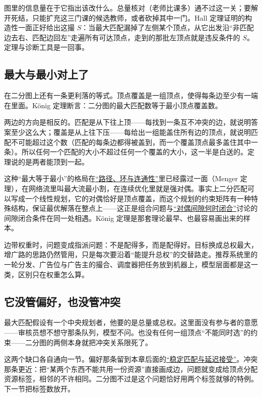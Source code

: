 图里的信息量在于它指出该改什么。总量核对（老师比课多）通不过这一关；要解开死结，只能扩充这三门课的候选教师，或者砍掉其中一门。Hall 定理证明的构造性一面正好给出这撮 \(S\)：当最大匹配漏掉了左侧某个顶点，从它出发沿``非匹配边去右、匹配边回左''走遍所有可达顶点，走到的那批左顶点就是违反条件的 \(S\)。定理与诊断工具是一回事。

\subsection{最大与最小对上了}

在二分图上还有一条更利落的等式。顶点覆盖是一组顶点，使得每条边至少有一端在里面。König 定理断言：二分图的最大匹配数等于最小顶点覆盖数。

两边的方向是相反的。匹配是从下往上顶——每找到一条互不冲突的边，就说明答案至少这么大；覆盖是从上往下压——每给出一组能盖住所有边的顶点，就说明匹配不可能超过这个数（匹配的每条边都得被盖到，而一个覆盖顶点最多盖住其中一条）。所以任何一个匹配的大小不超过任何一个覆盖的大小，这一半是白送的。定理说的是两者能顶到一起。

这种``最大等于最小''的格局在\hyperref[sec:04-Discrete-Mathematics/03-Graph-Theory/02]{``路径、环与连通性''}里已经露过一面（Menger 定理），在网络流里叫最大流最小割，在连续优化里就是强对偶。事实上二分匹配可以写成一个线性规划，它的对偶恰好是顶点覆盖，而这个规划的约束矩阵有一种特殊结构，保证最优解落在整点上——这正是组合问题与\hyperref[sec:09-Convex-Optimization/05-Duality/02]{``对偶间隙何时闭合''}讨论的间隙闭合条件在同一处相遇。König 定理是那套理论最早、也最容易画出来的样本。

边带权重时，问题变成指派问题：不是配得多，而是配得好。目标换成总权最大，增广路的思路仍然管用，只是每次要沿着``能提升总权''的交替路走。推荐系统里的一轮分发、广告位与广告主的撮合、调度器把任务放到机器上，模型层面都是这一类，区别只在权重怎么算。

\subsection{它没管偏好，也没管冲突}

最大匹配假设有一个中央规划者，他要的是总量或总权。这里面没有参与者的意愿——审核员想不想守那条队列，模型不问。也没有任何一组顶点``不能同时选''的约束——二分图的两侧本身就把冲突关系限死了。

这两个缺口各自通向一节。偏好那条留到本章后面的\hyperref[sec:04-Discrete-Mathematics/03-Graph-Theory/06]{``稳定匹配与延迟接受''}。冲突那条更近：把``某两个东西不能共用一份资源''直接画成边，问题就变成给顶点分配资源标签，相邻的不许相同。二分图不过是这个问题恰好用两个标签就够的特例。下一节把标签数放开。
